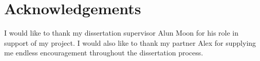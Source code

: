 
\chapter{Acknowledgements}
I would like to thank my dissertation supervisor Alun Moon for his role in support of my project. I would also like to thank my partner Alex for supplying me endless encouragement throughout the dissertation process.